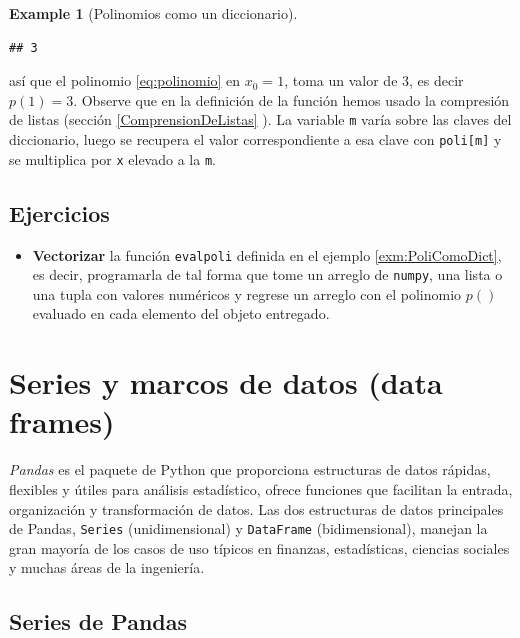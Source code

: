 \documentclass[
]{book}
\providecommand{\tightlist}{%
  \setlength{\itemsep}{0pt}\setlength{\parskip}{0pt}}
\theoremstyle{definition}
\theoremstyle{definition}
\newtheorem{example}{Example}[chapter]
\theoremstyle{definition}
\theoremstyle{definition}
\theoremstyle{remark}
\begin{document}
\begin{example}[Polinomios como un diccionario]
\begin{verbatim}
## 3
\end{verbatim}

así que el polinomio \eqref{eq:polinomio} en \(x_0=1\), toma un valor de 3, es decir \(p(1)=3\). Observe que en la definición de la función hemos usado la compresión de listas (sección \ref{ComprensionDeListas} ). La variable \texttt{m} varía sobre las claves del diccionario, luego se recupera el valor correspondiente a esa clave con \texttt{poli{[}m{]}} y se multiplica por \texttt{x} elevado a la \texttt{m}.
\end{example}

\hypertarget{ejercicios-2}{%
\subsection{Ejercicios}\label{ejercicios-2}}

\begin{itemize}
\tightlist
\item
  \textbf{Vectorizar} la función \texttt{evalpoli} definida en el ejemplo \ref{exm:PoliComoDict}, es decir, programarla de tal forma que tome un arreglo de \texttt{numpy}, una lista o una tupla con valores numéricos y regrese un arreglo con el polinomio \(p()\) evaluado en cada elemento del objeto entregado.
\end{itemize}

\hypertarget{series-y-marcos-de-datos-data-frames}{%
\section{\texorpdfstring{Series y marcos de datos (\textbf{data frames})}{Series y marcos de datos (data frames)}}\label{series-y-marcos-de-datos-data-frames}}

\emph{Pandas} \citep{reback2020pandas} es el paquete de Python que proporciona estructuras de datos rápidas, flexibles y útiles para análisis estadístico, ofrece funciones que facilitan la entrada, organización y transformación de datos. Las dos estructuras de datos principales de Pandas, \texttt{Series} (unidimensional) y \texttt{DataFrame} (bidimensional), manejan la gran mayoría de los casos de uso típicos en finanzas, estadísticas, ciencias sociales y muchas áreas de la ingeniería.

\hypertarget{series-de-pandas}{%
\subsection{Series de Pandas}\label{series-de-pandas}}
\end{document}
